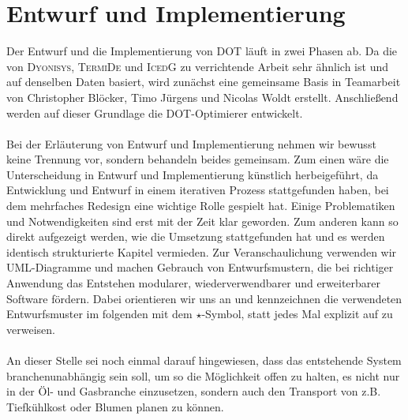 \chapter{Entwurf und Implementierung}
Der Entwurf und die Implementierung von \textsc{DOT} läuft in zwei Phasen ab. Da die von \textsc{Dyonisys}, \textsc{TermiDe} und \textsc{IcedG} zu verrichtende Arbeit sehr ähnlich ist und auf denselben Daten basiert, wird zunächst eine gemeinsame Basis in Teamarbeit von Christopher Blöcker, Timo Jürgens und Nicolas Woldt erstellt. Anschließend werden auf dieser Grundlage die \textsc{DOT}-Optimierer entwickelt. \\
\\
Bei der Erläuterung von Entwurf und Implementierung nehmen wir bewusst keine Trennung vor, sondern behandeln beides gemeinsam. Zum einen wäre die Unterscheidung in Entwurf und Implementierung künstlich herbeigeführt, da Entwicklung und Entwurf in einem iterativen Prozess stattgefunden haben, bei dem mehrfaches Redesign eine wichtige Rolle gespielt hat. Einige Problematiken und Notwendigkeiten sind erst mit der Zeit klar geworden. Zum anderen kann so direkt aufgezeigt werden, wie die Umsetzung stattgefunden hat und es werden identisch strukturierte Kapitel vermieden. Zur Veranschaulichung verwenden wir UML-Diagramme und machen Gebrauch von Entwurfsmustern, die bei richtiger Anwendung das Entstehen modularer, wiederverwendbarer und erweiterbarer Software fördern. Dabei orientieren wir uns an \cite{Gamma} und kennzeichnen die verwendeten Entwurfsmuster im folgenden mit dem $\star$-Symbol, statt jedes Mal explizit auf \cite{Gamma} zu verweisen. \\
\\
An dieser Stelle sei noch einmal darauf hingewiesen, dass das entstehende System branchenunabhängig sein soll, um so die Möglichkeit offen zu halten, es nicht nur in der Öl- und Gasbranche einzusetzen, sondern auch den Transport von z.B. Tiefkühlkost oder Blumen planen zu können.


